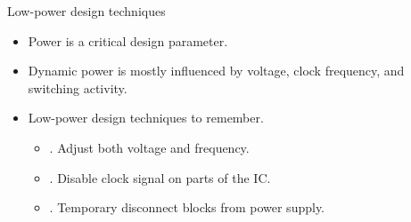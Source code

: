 \documentclass[]{slides}
\begin{document}
\begin{frame}{Low-power design techniques}{}
\begin{itemize}
\item Power is a critical design parameter.
\item Dynamic power is mostly influenced by voltage, clock frequency, and switching activity.
\item Low-power design techniques to remember.
\begin{itemize}
  \item {}. Adjust both voltage and frequency.
  \item {}. Disable clock signal on parts of the \ac{IC}.
  \item {}. Temporary disconnect blocks from power supply.
\end{itemize}
\end{itemize}
\end{frame}




\end{document}

